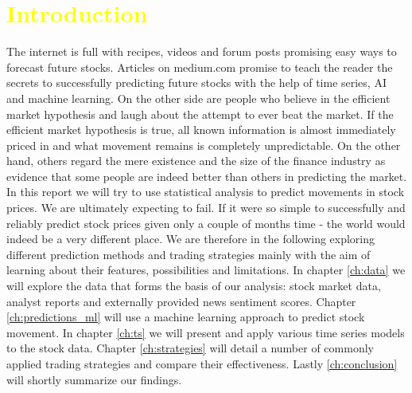 \chapter{\textcolor{yellow}{Introduction}} \label{ch:Introduction}

The internet is full with recipes, videos and forum posts promising easy ways to forecast future stocks. Articles on medium.com promise to teach the reader the secrets to successfully predicting future stocks with the help of time series, AI and machine learning. On the other side are people who believe in the efficient market hypothesis and laugh about the attempt to ever beat the market. If the efficient market hypothesis is true, all known information is almost immediately priced in and what movement remains is completely unpredictable. On the other hand, others regard the mere existence and the size of the finance industry as evidence that some people are indeed better than others in predicting the market. In this report we will try to use statistical analysis to predict movements in stock prices. We are ultimately expecting to fail. If it were so simple to successfully and reliably predict stock prices given only a couple of months time - the world would indeed be a very different place. We are therefore in the following exploring different prediction methods and trading strategies mainly with the aim of learning about their features, possibilities and limitations. In chapter \ref{ch:data} we will explore the data that forms the basis of our analysis: stock market data, analyst reports and externally provided news sentiment scores. Chapter \ref{ch:predictions_ml} will use a machine learning approach to predict stock movement. In chapter \ref{ch:ts} we will present and apply various time series models to the stock data. Chapter \ref{ch:strategies} will detail a number of commonly applied trading strategies and compare their effectiveness. Lastly \ref{ch:conclusion} will shortly summarize our findings. 







